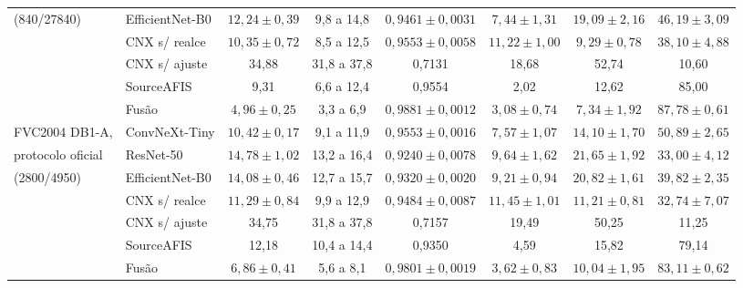 \documentclass[conference]{IEEEtran}
\begin{document}
\begin{table}[t]
\begin{tabular}{@{}llcccccc@{}}
(840/\num{27840}) & EfficientNet-B0 & $12{,}24\pm0{,}39$ & 9,8 a 14,8 & $0{,}9461\pm0{,}0031$ & $7{,}44\pm1{,}31$ & $19{,}09\pm2{,}16$ & $46{,}19\pm3{,}09$ \\
 & CNX s/ realce & $10{,}35\pm0{,}72$ & 8,5 a 12,5 & $0{,}9553\pm0{,}0058$ & $11{,}22\pm1{,}00$ & $9{,}29\pm0{,}78$ & $38{,}10\pm4{,}88$ \\
 & CNX s/ ajuste & 34,88 & 31,8 a 37,8 & 0,7131 & 18,68 & 52,74 & 10,60 \\
 & SourceAFIS & 9,31 & 6,6 a 12,4 & 0,9554 & 2,02 & 12,62 & 85,00 \\
 & Fusão & $4{,}96\pm0{,}25$ & 3,3 a 6,9 & $0{,}9881\pm0{,}0012$ & $3{,}08\pm0{,}74$ & $7{,}34\pm1{,}92$ & $87{,}78\pm0{,}61$ \\
\midrule
FVC2004 DB1-A, & ConvNeXt-Tiny & $10{,}42\pm0{,}17$ & 9,1 a 11,9 & $0{,}9553\pm0{,}0016$ & $7{,}57\pm1{,}07$ & $14{,}10\pm1{,}70$ & $50{,}89\pm2{,}65$ \\
protocolo oficial & ResNet-50 & $14{,}78\pm1{,}02$ & 13,2 a 16,4 & $0{,}9240\pm0{,}0078$ & $9{,}64\pm1{,}62$ & $21{,}65\pm1{,}92$ & $33{,}00\pm4{,}12$ \\
(\num{2800}/\num{4950}) & EfficientNet-B0 & $14{,}08\pm0{,}46$ & 12,7 a 15,7 & $0{,}9320\pm0{,}0020$ & $9{,}21\pm0{,}94$ & $20{,}82\pm1{,}61$ & $39{,}82\pm2{,}35$ \\
 & CNX s/ realce & $11{,}29\pm0{,}84$ & 9,9 a 12,9 & $0{,}9484\pm0{,}0087$ & $11{,}45\pm1{,}01$ & $11{,}21\pm0{,}81$ & $32{,}74\pm7{,}07$ \\
 & CNX s/ ajuste & 34,75 & 31,8 a 37,8 & 0,7157 & 19,49 & 50,25 & 11,25 \\
 & SourceAFIS & 12,18 & 10,4 a 14,4 & 0,9350 & 4,59 & 15,82 & 79,14 \\
 & Fusão & $6{,}86\pm0{,}41$ & 5,6 a 8,1 & $0{,}9801\pm0{,}0019$ & $3{,}62\pm0{,}83$ & $10{,}04\pm1{,}95$ & $83{,}11\pm0{,}62$ \\
\bottomrule
\end{tabular}
\end{table}
\end{document}

